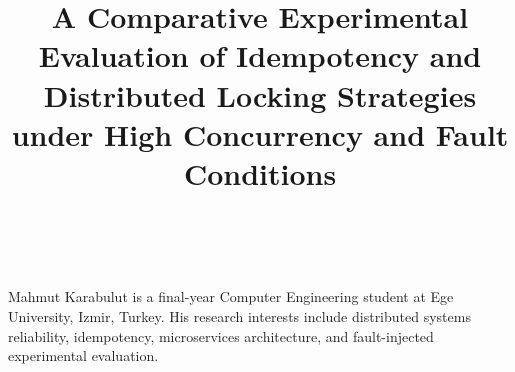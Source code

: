 \documentclass[journal]{IEEEtran}
\begin{document}
\title{A Comparative Experimental Evaluation of Idempotency and Distributed
Locking Strategies under High Concurrency and Fault Conditions}

\author{\\
}

\maketitle



\begin{IEEEbiographynophoto}{Mahmut Karabulut}
is a final-year Computer Engineering student at Ege University, Izmir, Turkey.
His research interests include distributed systems reliability, idempotency,
microservices architecture, and fault-injected experimental evaluation.
\end{IEEEbiographynophoto}
\end{document}
